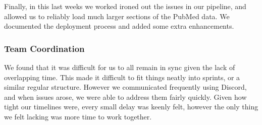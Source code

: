 Finally, in this last weeks we worked ironed out the issues in our pipeline, and allowed us to reliably load much larger sections of the PubMed data. We documented the deployment process and added some extra enhancements.

\subsubsection{Team Coordination}

We found that it was difficult for us to all remain in sync given the lack of overlapping time. This made it difficult to fit things neatly into sprints, or a similar regular structure. However we communicated frequently using Discord, and when issues arose, we were able to address them fairly quickly. Given how tight our timelines were, every small delay was keenly felt, however the only thing we felt lacking was more time to work together.